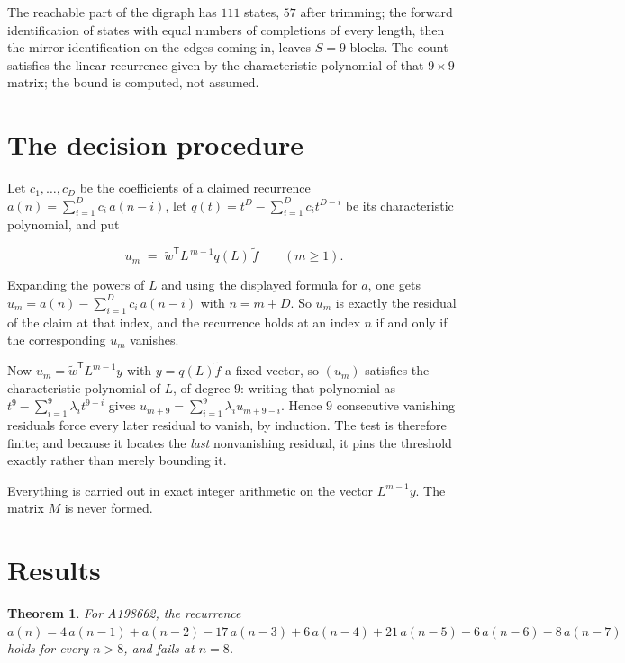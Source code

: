 \documentclass[11pt]{article}
\newtheorem{theorem}{Theorem}
\theoremstyle{definition}
\begin{document}
The reachable part of the digraph has $111$ states, $57$ after trimming; the forward identification of states with equal numbers of completions of every length, then the mirror identification on the edges coming in, leaves $S = 9$ blocks. The count satisfies the linear recurrence given by the characteristic polynomial of that $9\times9$ matrix; the bound is computed, not assumed.

\section{The decision procedure}

Let $c_1,\dots,c_D$ be the coefficients of a claimed recurrence $a(n) = \sum_{i=1}^{D} c_i\,a(n-i)$, let $q(t) = t^{D} - \sum_{i=1}^{D} c_i t^{D-i}$ be its characteristic polynomial, and put

\[u_m \;=\; \tilde w^{\mathsf T} L^{\,m-1} q(L)\,\tilde f \qquad (m \ge 1).\]

Expanding the powers of $L$ and using the displayed formula for $a$, one gets $u_m = a(n) - \sum_{i=1}^{D} c_i\,a(n-i)$ with $n = m + D$. So $u_m$ is exactly the residual of the claim at that index, and the recurrence holds at an index $n$ if and only if the corresponding $u_m$ vanishes.

Now $u_m = \tilde w^{\mathsf T} L^{m-1} y$ with $y = q(L)\tilde f$ a fixed vector, so $(u_m)$ satisfies the characteristic polynomial of $L$, of degree $9$: writing that polynomial as $t^{9} - \sum_{i=1}^{9} \lambda_i t^{9-i}$ gives $u_{m+9} = \sum_{i=1}^{9} \lambda_i u_{m+9-i}$. Hence $9$ consecutive vanishing residuals force every later residual to vanish, by induction. The test is therefore finite; and because it locates the {\itshape last} nonvanishing residual, it pins the threshold exactly rather than merely bounding it.

Everything is carried out in exact integer arithmetic on the vector $L^{m-1}y$. The matrix $M$ is never formed.

\section{Results}

\begin{theorem} For A198662, the recurrence $a(n) = 4\,a(n-1) + a(n-2) - 17\,a(n-3) + 6\,a(n-4) + 21\,a(n-5) - 6\,a(n-6) - 8\,a(n-7)$ holds for every $n > 8$, and fails at $n = 8$.\end{theorem}
\end{document}
